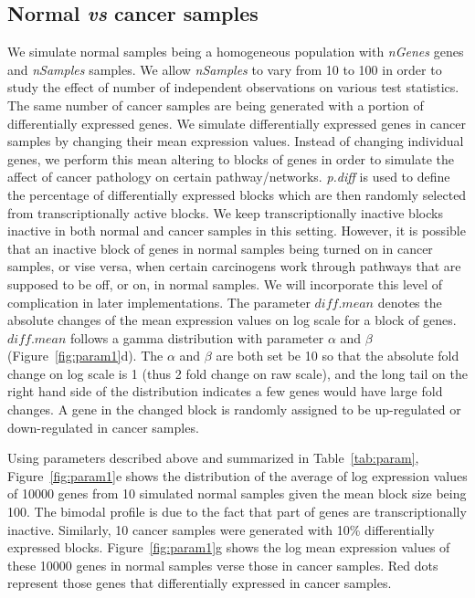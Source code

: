 \documentclass[11pt]{article}
\begin{document}
\subsection{ Normal \textit{vs} cancer samples }

We simulate normal samples being a homogeneous population with
\textit{nGenes} genes and \textit{nSamples} samples. We allow
\textit{nSamples} to vary from 10 to 100 in order to study the effect
of number of independent observations on various test statistics. The
same number of cancer samples are being generated with a portion of
differentially expressed genes. We simulate differentially expressed
genes in cancer samples by changing their mean expression
values. Instead of changing individual genes, we perform this mean
altering to blocks of genes in order to simulate the affect of cancer
pathology on certain pathway/networks. \textit{p.diff} is used to
define the percentage of differentially expressed blocks which are
then randomly selected from transcriptionally active blocks. We keep
transcriptionally inactive blocks inactive in both normal and cancer
samples in this setting. However, it is possible that an inactive
block of genes in normal samples being turned on in cancer samples, or
vise versa, when certain carcinogens work through pathways that are
supposed to be off, or on, in normal samples. We will incorporate this
level of complication in later implementations. The parameter
$diff.mean$ denotes the absolute changes of the mean expression values
on log scale for a block of genes. $diff.mean$ follows a gamma
distribution with parameter $\alpha$ and $\beta$
(Figure~\ref{fig:param1}d). The $\alpha$ and $\beta$ are both set be
10 so that the absolute fold change on log scale is 1 (thus 2 fold
change on raw scale), and the long tail on the right hand side of the
distribution indicates a few genes would have large fold changes. A
gene in the changed block is randomly assigned to be up-regulated or
down-regulated in cancer samples. 

Using parameters described above and summarized in
Table~\ref{tab:param}, Figure~\ref{fig:param1}e shows the distribution
of the average of log expression values of 10000 genes from 10
simulated normal samples given the mean block size being 100. The
bimodal profile is due to the fact that part of genes are
transcriptionally inactive. Similarly, 10 cancer samples were
generated with 10\% differentially expressed
blocks. Figure~\ref{fig:param1}g shows the log mean expression values
of these 10000 genes in normal samples verse those in cancer
samples. Red dots represent those genes that differentially expressed
in cancer samples. 
\end{document}
